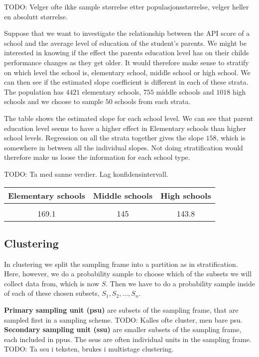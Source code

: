 \documentclass{article}
\begin{document}
TODO: Velger ofte ikke sample størrelse etter populasjonsstørrelse, velger
heller en absolutt størrelse.

\begin{example}
  Suppose that we want to investigate the relationship between the API score of
  a school and the average level of education of the student's parents. We might
  be interested in knowing if the effect the parents education level has on
  their childs performance changes as they get older. It would therefore make
  sense to stratify on which level the school is, elementary school, middle
  school or high school. We can then see if the estimated slope coefficient is
  different in each of these strata.
  The population has \(4421\) elementary schools, \(755\) middle schools and
  \(1018\) high schools and we choose to sample \(50\) schools from each strata.

  The table shows the estimated slope for each school level. We can see that
  parent education level seems to have a higher effect in Elementary schools
  than higher school levels. Regression on all the strata together gives the
  slope \(158\), which is somewhere in between all the individual slopes. Not
  doing stratification would therefore make us loose the information for each
  school type.

  TODO: Ta med sanne verdier. Lag konfidensintervall.

  \begin{center}
  \begin{tabular}{ccc}
    Elementary schools & Middle schools & High schools \\
    \hline \\
    169.1 & 145 & 143.8
  \end{tabular}
  \end{center}
\end{example}


\subsection{Clustering}


In clustering we split the sampling frame into a partition as in stratification.
Here, however, we do a probability sample to choose which of the subsets we will
collect data from, which is now \(S\). Then we have to do a probability sample
inside of each of these chosen subsets, \(S_1, S_2, \dots, S_n\).

\begin{definition}
 \textbf{Primary sampling unit (psu)} are subsets of the sampling frame, that
 are sampled first in a sampling scheme. TODO: Kalles ofte cluster, men bare psu. \\
 \textbf{Secondary sampling unit (ssu)} are smaller subsets of the sampling
 frame, each included in ppus. The ssus are often individual units in the
 sampling frame. TODO: Ta ssu i teksten, brukes i multistage clustering.
\end{definition}
\end{document}
